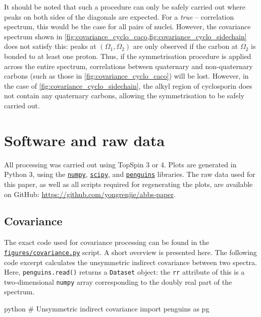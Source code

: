 \documentclass[a4paper,12pt]{article}
\newcommand{\carbon}{\ch{^{13}C}}
\begin{document}
\begin{refsection}
It should be noted that such a procedure can only be safely carried out where peaks on both sides of the diagonals are expected.
For a \textit{true} \carbon{}--\carbon{} correlation spectrum, this would be the case for all pairs of \carbon{} nuclei.
However, the covariance spectrum shown in \cref{fig:covariance_cyclo_caco,fig:covariance_cyclo_sidechain} does not satisfy this: peaks at $(\Omega_1, \Omega_2)$ are only observed if the carbon at $\Omega_2$ is bonded to at least one proton.
Thus, if the symmetrisation procedure is applied across the entire spectrum, correlations between quaternary and non-quaternary carbons (such as those in \cref{fig:covariance_cyclo_caco}) will be lost.
However, in the case of \cref{fig:covariance_cyclo_sidechain}, the alkyl region of cyclosporin does not contain any quaternary carbons, allowing the symmetrisation to be safely carried out.


\clearpage

\section{Software and raw data}

All processing was carried out using TopSpin 3 or 4.
Plots are generated in Python 3, using the \href{https://github.com/numpy/numpy}{\texttt{numpy}}, \href{https://github.com/scipy/scipy}{\texttt{scipy}}, and \href{https://github.com/yongrenjie/penguins}{\texttt{penguins}} libraries.
The raw data used for this paper, as well as all scripts required for regenerating the plots, are available on GitHub: \url{https://github.com/yongrenjie/abbs-paper}.

\subsection{Covariance}

The exact code used for covariance processing can be found in the \href{https://github.com/yongrenjie/abbs-paper/blob/main/figures/covariance.py}{\texttt{figures/covariance.py}} script.
A short overview is presented here.
The following code excerpt calculates the unsymmetric indirect covariance between two spectra.
Here, \texttt{penguins.read()} returns a \texttt{Dataset} object: the \texttt{rr} attribute of this is a two-dimensional \texttt{numpy} array corresponding to the doubly real part of the spectrum.

{\singlespacing
\begin{tcbminted}{python}
# Unsymmetric indirect covariance
import penguins as pg


\end{tcbminted}}
\end{refsection}
\end{document}

